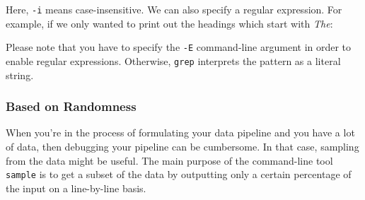 \documentclass[
]{book}
\newenvironment{Shaded}{\begin{snugshade}}{\end{snugshade}}
\newcommand{\DataTypeTok}[1]{\textcolor[rgb]{0.13,0.29,0.53}{#1}}
\newcommand{\ExtensionTok}[1]{#1}
\newcommand{\FunctionTok}[1]{\textcolor[rgb]{0.00,0.00,0.00}{#1}}
\newcommand{\KeywordTok}[1]{\textcolor[rgb]{0.13,0.29,0.53}{\textbf{#1}}}
\newcommand{\NormalTok}[1]{#1}
\newcommand{\StringTok}[1]{\textcolor[rgb]{0.31,0.60,0.02}{#1}}
\theoremstyle{definition}
\theoremstyle{definition}
\theoremstyle{definition}
\theoremstyle{remark}
\begin{document}
Here, \texttt{-i} means case-insensitive. We can also specify a regular expression. For example, if we only wanted to print out the headings which start with \emph{The}:

\begin{Shaded}
\end{Shaded}

Please note that you have to specify the \texttt{-E} command-line argument in order to enable regular expressions. Otherwise, \texttt{grep} interprets the pattern as a literal string.

\hypertarget{based-on-randomness}{%
\subsubsection{Based on Randomness}\label{based-on-randomness}}

When you're in the process of formulating your data pipeline and you have a lot of data, then debugging your pipeline can be cumbersome. In that case, sampling from the data might be useful. The main purpose of the command-line tool \texttt{sample} \citep{sample} is to get a subset of the data by outputting only a certain percentage of the input on a line-by-line basis.

\begin{Shaded}
\end{Shaded}
\end{document}
